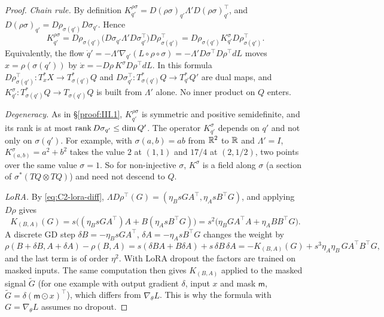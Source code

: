 \begin{proof}
\emph{Chain rule.} By definition $K^{\rho\sigma}_{q'}=D(\rho\sigma)_{q'}\Lambda'D(\rho\sigma)_{q'}^\top$, and
$D(\rho\sigma)_{q'}=D\rho_{\sigma(q')}D\sigma_{q'}$. Hence
\[K^{\rho\sigma}_{q'}=D\rho_{\sigma(q')}\big(D\sigma_{q'}\Lambda'D\sigma_{q'}^\top\big)D\rho_{\sigma(q')}^\top
=D\rho_{\sigma(q')}K^\sigma_{q'}D\rho_{\sigma(q')}^\top.\]
Equivalently, the flow $\dot q'=-\Lambda'\nabla_{q'}(L\circ\rho\circ\sigma)=-\Lambda'D\sigma^\top D\rho^\top dL$ moves
$x=\rho(\sigma(q'))$ by $\dot x=-D\rho\,K^\sigma D\rho^\top dL$. In this formula
$D\rho_{\sigma(q')}^\top:T^*_xX\to T^*_{\sigma(q')}Q$ and $D\sigma_{q'}^\top:T^*_{\sigma(q')}Q\to T^*_{q'}Q'$ are dual
maps, and $K^\sigma_{q'}:T^*_{\sigma(q')}Q\to T_{\sigma(q')}Q$ is built from $\Lambda'$ alone. No inner product on $Q$
enters.

\emph{Degeneracy.} As in \S\ref{proof:III.1}, $K^{\rho\sigma}_{q'}$ is symmetric and positive semidefinite, and its
rank is at most $\operatorname{rank} D\sigma_{q'}\le\dim Q'$. The operator $K^\sigma_{q'}$ depends on $q'$ and not only on
$\sigma(q')$. For example, with $\sigma(a,b)=ab$ from $\mathbb{R}^2$ to $\mathbb{R}$ and $\Lambda'=I$, $K^\sigma_{(a,b)}=a^2+b^2$ takes
the value $2$ at $(1,1)$ and $17/4$ at $(2,1/2)$, two points over the same value $\sigma=1$. So for non-injective
$\sigma$, $K^\sigma$ is a field along $\sigma$ (a section of $\sigma^*(TQ\otimes TQ)$) and need not descend to $Q$.

\emph{LoRA.} By \eqref{eq:C2-lora-diff}, $\Lambda D\rho^\top(G)=(\eta_BsGA^\top,\eta_AsB^\top G)$, and applying $D\rho$
gives
\[K_{(B,A)}(G)=s\big((\eta_BsGA^\top)A+B(\eta_AsB^\top G)\big)=s^2\big(\eta_BGA^\top A+\eta_ABB^\top G\big).\]
A discrete GD step $\delta B=-\eta_BsGA^\top$, $\delta A=-\eta_AsB^\top G$ changes the weight by
\[\rho(B+\delta B,A+\delta A)-\rho(B,A)=s(\delta BA+B\delta A)+s\,\delta B\,\delta A
=-K_{(B,A)}(G)+s^3\eta_A\eta_B\,GA^\top B^\top G,\]
and the last term is of order $\eta^2$. With LoRA dropout the factors are trained on masked inputs. The same computation
then gives $K_{(B,A)}$ applied to the masked signal $\tilde G$ (for one example with output gradient $\delta$, input $x$
and mask $\mathsf m$, $\tilde G=\delta(\mathsf m\odot x)^\top$), which differs from $\nabla_\theta L$. This is why the
formula with $G=\nabla_\theta L$ assumes no dropout.


\end{proof}
